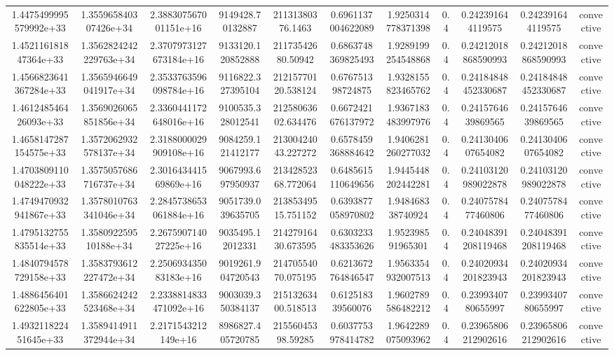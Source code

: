 \begin{table}
\begin{tabular}{ccccccccccc}
1.4475499995579992e+33 & 1.355965840307426e+34 & 2.388307567001151e+16 & 9149428.70132887 & 21131380376.1463 & 0.6961137004622089 & 1.9250314778371398 & 0.4 & 0.242391644119575 & 0.242391644119575 & convective \\
1.452116181847364e+33 & 1.3562824242229763e+34 & 2.3707973127673184e+16 & 9133120.120852888 & 21173542680.50942 & 0.6863748369825493 & 1.9289199254548868 & 0.4 & 0.24212018868590993 & 0.24212018868590993 & convective \\
1.4566823641367284e+33 & 1.3565946649041917e+34 & 2.3533763596098784e+16 & 9116822.327395104 & 21215770120.538124 & 0.676751398724875 & 1.9328155823465762 & 0.4 & 0.24184848452330687 & 0.24184848452330687 & convective \\
1.461248546426093e+33 & 1.3569026065851856e+34 & 2.3360441172648016e+16 & 9100535.328012541 & 21258063602.634476 & 0.6672421676137972 & 1.9367183483997976 & 0.4 & 0.2415764639869565 & 0.2415764639869565 & convective \\
1.4658147287154575e+33 & 1.3572062932578137e+34 & 2.3188000029909108e+16 & 9084259.121412177 & 21300424043.227272 & 0.6578459368884642 & 1.9406281260277032 & 0.4 & 0.2413040607654082 & 0.2413040607654082 & convective \\
1.4703809110048222e+33 & 1.3575057686716737e+34 & 2.301643441569869e+16 & 9067993.697950937 & 21342852368.772064 & 0.6485615110649656 & 1.9445448202442281 & 0.4 & 0.24103120989022878 & 0.24103120989022878 & convective \\
1.4749470932941867e+33 & 1.3578010763341046e+34 & 2.2845738653061884e+16 & 9051739.039635705 & 21385349515.751152 & 0.6393877058970802 & 1.948468338740924 & 0.4 & 0.2407578477460806 & 0.2407578477460806 & convective \\
1.4795132755835514e+33 & 1.358092259510188e+34 & 2.267590714027225e+16 & 9035495.12012331 & 21427916430.673595 & 0.6303233483353626 & 1.952398591965301 & 0.4 & 0.24048391208119468 & 0.24048391208119468 & convective \\
1.4840794578729158e+33 & 1.3583793612227472e+34 & 2.250693435083183e+16 & 9019261.904720543 & 21470554070.075195 & 0.6213672764846547 & 1.9563354932007513 & 0.4 & 0.24020934201823943 & 0.24020934201823943 & convective \\
1.4886456401622805e+33 & 1.3586624242523468e+34 & 2.2338814833471092e+16 & 9003039.350384137 & 21513263400.518513 & 0.612518339560076 & 1.9602789586482212 & 0.4 & 0.2399340780655997 & 0.2399340780655997 & convective \\
1.493211822451645e+33 & 1.3589414911372944e+34 & 2.2171543212149e+16 & 8986827.405720785 & 21556045398.59285 & 0.6037753978414782 & 1.9642289075093962 & 0.4 & 0.23965806212902616 & 0.23965806212902616 & convective \\

\end{tabular}
\end{table}
